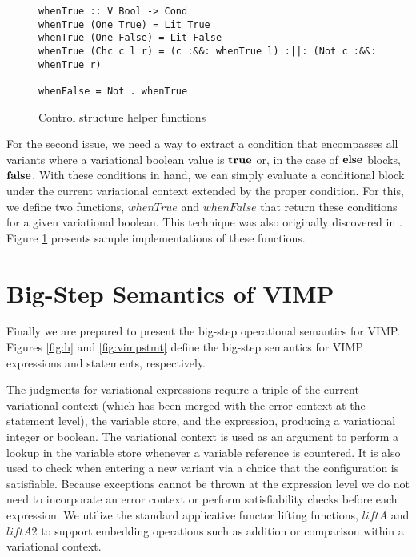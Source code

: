 \documentclass[12pt,oneside]{book}
\begin{document}
\begin{figure}
\begin{lstlisting}
whenTrue :: V Bool -> Cond
whenTrue (One True) = Lit True
whenTrue (One False) = Lit False
whenTrue (Chc c l r) = (c :&&: whenTrue l) :||: (Not c :&&: whenTrue r)

whenFalse = Not . whenTrue
\end{lstlisting}
\caption{Control structure helper functions}
\label{fig:when}
\end{figure}

For the second issue, we need a way to extract a condition that encompasses all variants where a variational boolean value is $\textbf{\textup{\textrm{true}}}$ or, in the case of $\textbf{\textup{\textrm{else}}}$ blocks,
$\textbf{\textup{\textrm{false}}}$. With these conditions in hand, we can simply evaluate a conditional block under the current variational context extended by the proper condition. For this, we define two functions, $\mathit{whenTrue}$ and $\mathit{whenFalse}$ that return these conditions for a given variational boolean.
This technique was also originally discovered in \cite{varwhile}.  Figure \ref{fig:when} presents sample implementations of these functions.

\section{Big-Step Semantics of VIMP}
\label{sec:bigvimp}

Finally we are prepared to present the big-step operational semantics for VIMP. Figures \ref{fig:h} and \ref{fig:vimpstmt} define the big-step semantics for VIMP expressions and
statements, respectively.

The judgments for variational expressions require a triple of the current variational context (which has been merged with the error context at the statement level), the variable store, and the expression, producing a variational integer or boolean.
The variational context is used as an argument to perform a lookup in the variable store whenever a variable reference is countered. It is also used to check when entering
a new variant via a choice that the configuration is satisfiable. Because exceptions cannot be thrown at the expression level we do not need to incorporate an error context or
perform satisfiability checks before each expression. We utilize the standard applicative functor lifting functions, $\mathit{liftA}$ and $\mathit{liftA2}$ to support embedding
operations such as addition or comparison within a variational context.
\end{document}
